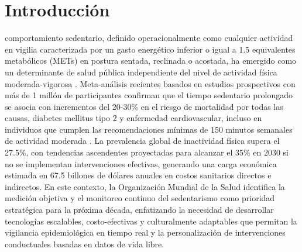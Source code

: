 
\section{Introducción}
\label{sec:introduccion}


 comportamiento sedentario, definido operacionalmente como cualquier actividad en vigilia caracterizada por un gasto energético inferior o igual a 1.5 equivalentes metabólicos (METs) en postura sentada, reclinada o acostada, ha emergido como un determinante de salud pública independiente del nivel de actividad física moderada-vigorosa \cite{Bull2020,WHO2020}. Meta-análisis recientes basados en estudios prospectivos con más de 1 millón de participantes confirman que el tiempo sedentario prolongado se asocia con incrementos del 20-30\% en el riesgo de mortalidad por todas las causas, diabetes mellitus tipo 2 y enfermedad cardiovascular, incluso en individuos que cumplen las recomendaciones mínimas de 150 minutos semanales de actividad moderada \cite{Guthold2020}. La prevalencia global de inactividad física supera el 27.5\%, con tendencias ascendentes proyectadas para alcanzar el 35\% en 2030 si no se implementan intervenciones efectivas, generando una carga económica estimada en 67.5 billones de dólares anuales en costos sanitarios directos e indirectos. En este contexto, la Organización Mundial de la Salud identifica la medición objetiva y el monitoreo continuo del sedentarismo como prioridad estratégica para la próxima década, enfatizando la necesidad de desarrollar tecnologías escalables, costo-efectivas y culturalmente adaptables que permitan la vigilancia epidemiológica en tiempo real y la personalización de intervenciones conductuales basadas en datos de vida libre.

